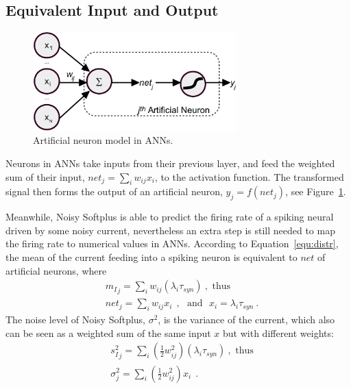 	\subsection{Equivalent Input and Output}
	
	\begin{figure}[bt]
		\centering
		\includegraphics[width=0.7\textwidth]{pics_sdlm/neuron.pdf}
		\caption{Artificial neuron model in ANNs. }
		\label{Fig:neuron}
	\end{figure}
	Neurons in ANNs take inputs from their previous layer, and feed the weighted sum of their input, $net_j = \sum_i w_{ij}x_i$, to the activation function.
	The transformed signal then forms the output of an artificial neuron, $y_j=f(net_j)$, see Figure~\ref{Fig:neuron}.
	
	Meanwhile, Noisy Softplus is able to predict the firing rate of a spiking neural driven by some noisy current, nevertheless an extra step is still needed to map the firing rate to numerical values in ANNs.
	According to Equation~\ref{equ:distr}, the mean of the current feeding into a spiking neuron is equivalent to $net$ of artificial neurons, where
	\begin{equation}
	\begin{aligned}
		& {m_I}_j = \sum_i w_{ij}(\lambda_{i}\tau_{syn})~, \textrm{  thus}\\
		& net_j= \sum_i w_{ij} x_i~~, \textrm{~~and~~}
		x_i = \lambda_{i}\tau_{syn}~.
	\end{aligned}
	\end{equation}
	The noise level of Noisy Softplus, $\sigma^2$, is the variance of the current, which also can be seen as a weighted sum of the same input $x$ but with different weights:
	\begin{equation}
	\begin{aligned}
		& {s_I^2}_j=\sum_i(\frac{1}{2} w_{ij}^2) (\lambda_{i}\tau_{syn})~, \textrm{  thus}\\
		& \sigma^2_j= \sum_i (\frac{1}{2} w_{ij}^2) x_i~~.
	\end{aligned}
	\end{equation}
	
